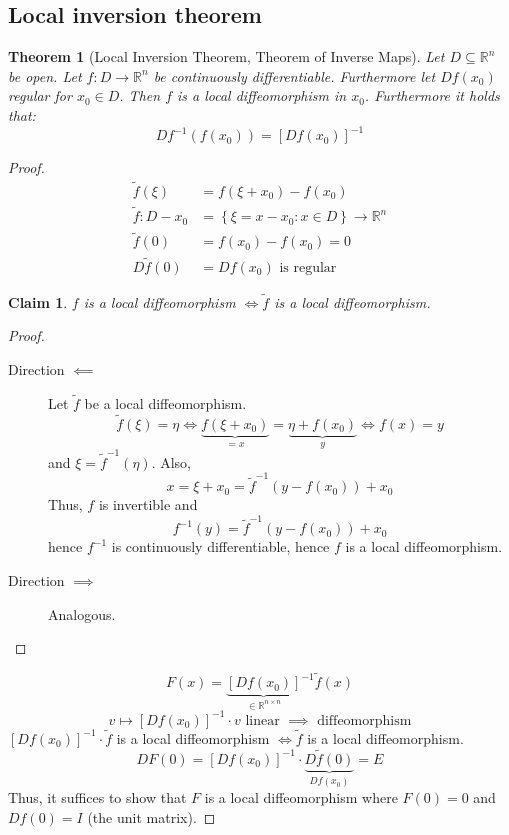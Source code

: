 \documentclass{article}
\newtheorem{theorem}{Theorem}  \numberwithin{theorem}{section}
\newtheorem*{claim}{Claim}%
\newcommand{\set}[1]{\left\{#1\right\}}
\begin{document}
\subsection{Local inversion theorem}
\begin{theorem}[Local Inversion Theorem, Theorem of Inverse Maps]
  \label{thm:lit}
  Let $D \subseteq \mathbb R^n$ be open. Let $f: D \to \mathbb R^n$ be continuously differentiable.
  Furthermore let $Df(x_0)$ regular for $x_0 \in D$. Then $f$ is a local diffeomorphism in $x_0$.
  Furthermore it holds that:
  \[ Df^{-1}(f(x_0)) = [Df(x_0)]^{-1} \]
\end{theorem}
\begin{proof}
  \begin{align*}
    \tilde f(\xi) &= f(\xi + x_0) - f(x_0) \\
    \tilde f: D - x_0 &= \set{\xi = x - x_0: x \in D} \to \mathbb R^n \\
    \tilde f(0) &= f(x_0) - f(x_0) = 0 \\
    D\tilde f(0) &= Df(x_0) \text{ is regular}
  \end{align*}
  \begin{claim}
    $f$ is a local diffeomorphism $\iff \tilde f$ is a local diffeomorphism.
  \end{claim}
  
  \begin{proof}
    \begin{description}
      \item[Direction $\impliedby$]
	    Let $\tilde f$ be a local diffeomorphism.
	    \[ \tilde f(\xi) = \eta \iff \underbrace{f(\xi + x_0)}_{= x} = \underbrace{\eta + f(x_0)}_{y} \iff f(x) = y \]
	    and $\xi = \tilde f^{-1}(\eta)$. Also,
	    \[ x = \xi + x_0 = \tilde f^{-1}(y - f(x_0)) + x_0 \]
	    Thus, $f$ is invertible and
	    \[ f^{-1}(y) = \tilde f^{-1}(y - f(x_0)) + x_0 \]
	    hence $f^{-1}$ is continuously differentiable, hence $f$ is a local diffeomorphism.
	  \item[Direction $\implies$] Analogous.
    \end{description}
  \end{proof}
  \[ F(x) = {\underbrace{[Df(x_0)]}_{\in \mathbb R^{n \times n}}}^{-1} \tilde f(x) \]
  \[ v \mapsto [Df(x_0)]^{-1} \cdot v \text{ linear } \implies \text{ diffeomorphism} \]
  $[Df(x_0)]^{-1} \cdot \tilde f$ is a local diffeomorphism $\iff \tilde f$ is a local diffeomorphism.
  \[ DF(0) = [Df(x_0)]^{-1} \cdot \underbrace{D \tilde f(0)}_{Df(x_0)} = E \]
  Thus, it suffices to show that $F$ is a local diffeomorphism where $F(0) = 0$ and $Df(0) = I$ (the unit matrix).
  

\end{proof}
\end{document}
